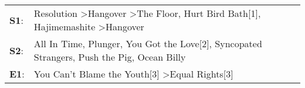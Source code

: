 \begin{supertabular}{p{0.03\textwidth}p{0.92\textwidth}}
 \textbf{S1}:  &  Resolution\textsuperscript{} \textgreater \enspace Hangover\textsuperscript{} \textgreater \enspace The Floor\textsuperscript{}, \enspace Hurt Bird Bath[1]\textsuperscript{}, \enspace Hajimemashite\textsuperscript{} \textgreater \enspace Hangover\textsuperscript{}  \enspace  \\
 \textbf{S2}:  &                       All In Time\textsuperscript{}, \enspace Plunger\textsuperscript{}, \enspace You Got the Love[2]\textsuperscript{}, \enspace Syncopated Strangers\textsuperscript{}, \enspace Push the Pig\textsuperscript{}, \enspace Ocean Billy\textsuperscript{}  \enspace  \\
 \textbf{E1}:  &                                                                                                                                                                    You Can't Blame the Youth[3]\textsuperscript{} \textgreater \enspace Equal Rights[3]\textsuperscript{}  \enspace  \\
\end{supertabular}
